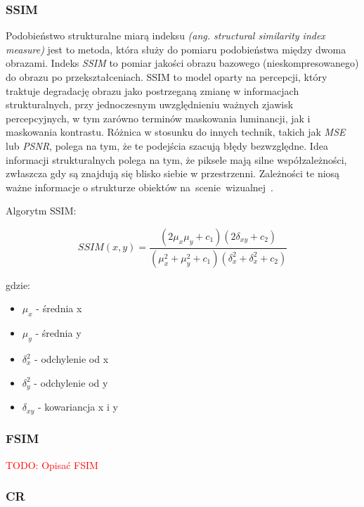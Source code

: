 \documentclass{article}
\newcommand{\todo}[1]{\textcolor{red}{TODO: #1}}
\begin{document}
\subsubsection{SSIM}

Podobieństwo strukturalne miarą indeksu \textit{(ang. structural similarity index measure)} jest to metoda, która służy 
do pomiaru podobieństwa między dwoma obrazami. Indeks \textit{SSIM} to pomiar jakości obrazu bazowego (nieskompresowanego) 
do obrazu po przekształceniach. SSIM to model oparty na percepcji, który traktuje degradację obrazu jako postrzeganą zmianę
w informacjach strukturalnych, przy jednoczesnym uwzględnieniu ważnych zjawisk percepcyjnych, w tym zarówno terminów maskowania 
luminancji, jak i maskowania kontrastu. Różnica w stosunku do innych technik, takich jak \textit{MSE} lub \textit{PSNR},
polega na tym, że te podejścia szacują błędy bezwzględne. Idea informacji strukturalnych polega na tym, że piksele mają silne współzależności,
zwłaszcza gdy są znajdują się blisko siebie w przestrzenni. Zależności te niosą ważne informacje o strukturze obiektów \mbox{na scenie wizualnej \cite{channappayya2008rate}.}

Algorytm SSIM:

\begin{equation}
SSIM(x, y) = \frac{(2\mu_{x}\mu_{y} + c_{1}) (2\delta_{xy} + c_2)}{(\mu_{x}^2 + \mu_{y}^2 + c_{1}) (\delta_{x}^2 + \delta_{x}^2 + c_2)}
\end{equation}

gdzie:
\begin{itemize}[label=]
    \item $\mu_{x}$ - średnia x
    \item $\mu_{y}$ - średnia y
    \item $\delta_{x}^2$ - odchylenie od x
    \item $\delta_{y}^2$ - odchylenie od y
    \item $\delta_{xy}$ - kowariancja x i y
\end{itemize}

\subsubsection{FSIM}

\todo{Opisać FSIM}

\subsubsection{CR}
\end{document}
